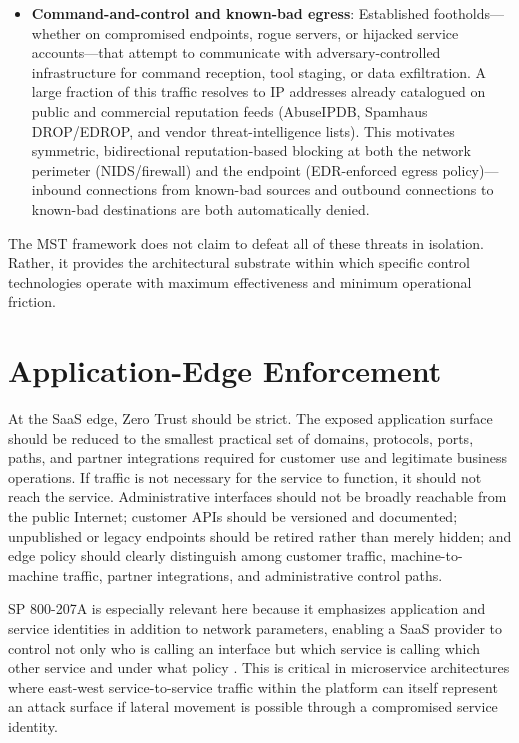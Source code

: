 \documentclass[unnumsec,webpdf,contemporary,large]{oup-authoring-template}
\theoremstyle{thmstyleone}
\theoremstyle{thmstyletwo}
\theoremstyle{thmstylethree}
\begin{document}
\begin{itemize}
\item \textbf{Command-and-control and known-bad egress}: Established footholds---whether
      on compromised endpoints, rogue servers, or hijacked service accounts---that
      attempt to communicate with adversary-controlled infrastructure for command
      reception, tool staging, or data exfiltration. A large fraction of this traffic
      resolves to IP addresses already catalogued on public and commercial reputation
      feeds (AbuseIPDB, Spamhaus DROP/EDROP, and vendor threat-intelligence lists).
      This motivates symmetric, bidirectional reputation-based blocking at both the
      network perimeter (NIDS/firewall) and the endpoint (EDR-enforced egress
      policy)---inbound connections from known-bad sources and outbound connections
      to known-bad destinations are both automatically denied.
\end{itemize}

The MST framework does not claim to defeat all of these threats in isolation.
Rather, it provides the architectural substrate within which specific control technologies
operate with maximum effectiveness and minimum operational friction.

\section{Application-Edge Enforcement}

At the SaaS edge, Zero Trust should be strict. The exposed application surface should be
reduced to the smallest practical set of domains, protocols, ports, paths, and partner
integrations required for customer use and legitimate business operations. If traffic is
not necessary for the service to function, it should not reach the service. Administrative
interfaces should not be broadly reachable from the public Internet; customer APIs should
be versioned and documented; unpublished or legacy endpoints should be retired rather than
merely hidden; and edge policy should clearly distinguish among customer traffic,
machine-to-machine traffic, partner integrations, and administrative control paths.

SP 800-207A is especially relevant here because it emphasizes application and service
identities in addition to network parameters, enabling a SaaS provider to control not only
who is calling an interface but which service is calling which other service and under what
policy \cite{chandramouli2023}. This is critical in microservice architectures where
east-west service-to-service traffic within the platform can itself represent an attack
surface if lateral movement is possible through a compromised service identity.
\end{document}
